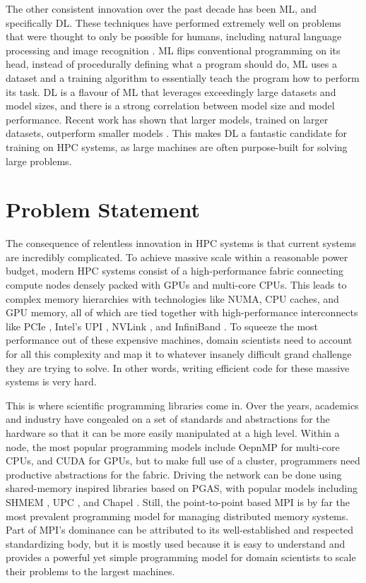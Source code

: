 The other consistent innovation over the past decade has been \gls{ML}, and specifically \gls{DL}.
These techniques have performed extremely well on problems that were thought to only be possible for humans, including natural language processing \cite{Vaswani2017AttentionTransformer} and image recognition \cite{Krizhevsky2012AlexNet}.
\gls{ML} flips conventional programming on its head, instead of procedurally defining what a program should do, \gls{ML} uses a dataset and a training algorithm to essentially teach the program how to perform its task.
\gls{DL} is a flavour of \gls{ML} that leverages exceedingly large datasets and model sizes, and there is a strong correlation between model size and model performance.
Recent work has shown that larger models, trained on larger datasets, outperform smaller models \cite{Brown2020GPT3}.
This makes \gls{DL} a fantastic candidate for training on \gls{HPC} systems, as large machines are often purpose-built for solving large problems. 

\section{Problem Statement}
The consequence of relentless innovation in \gls{HPC} systems is that current systems are incredibly complicated.
To achieve massive scale within a reasonable power budget, modern \gls{HPC} systems consist of a high-performance fabric connecting compute nodes densely packed with \gls{GPU}s and multi-core \gls{CPU}s.
This leads to complex memory hierarchies with technologies like \gls{NUMA}, \gls{CPU} caches, and \gls{GPU} memory, all of which are tied together with high-performance interconnects like \gls{PCIe} \cite{PCIeV5Spec}, Intel's \gls{UPI} \cite{XeonTechOverview}, NVLink \cite{Foley2017PascaleAndNVLink}, and InfiniBand \cite{IBSpec}.
To squeeze the most performance out of these expensive machines, domain scientists need to account for all this complexity and map it to whatever insanely difficult grand challenge they are trying to solve.
In other words, writing efficient code for these massive systems is very hard.

This is where scientific programming libraries come in.
Over the years, academics and industry have congealed on a set of standards and abstractions for the hardware so that it can be more easily manipulated at a high level.
Within a node, the most popular programming models include OepnMP \cite{OpenMP} for multi-core \gls{CPU}s, and CUDA for \gls{GPU}s, but to make full use of a cluster, programmers need productive abstractions for the fabric.
Driving the network can be done using shared-memory inspired libraries based on \gls{PGAS}, with popular models including SHMEM \cite{OpenSHMEM}, \gls{UPC} \cite{UPC}, and Chapel \cite{Chapel}. 
Still, the point-to-point based \gls{MPI} \cite{mpi40} is by far the most prevalent programming model for managing distributed memory systems.
Part of \gls{MPI}'s dominance can be attributed to its well-established and respected standardizing body, but it is mostly used because it is easy to understand and provides a powerful yet simple programming model for domain scientists to scale their problems to the largest machines. 

